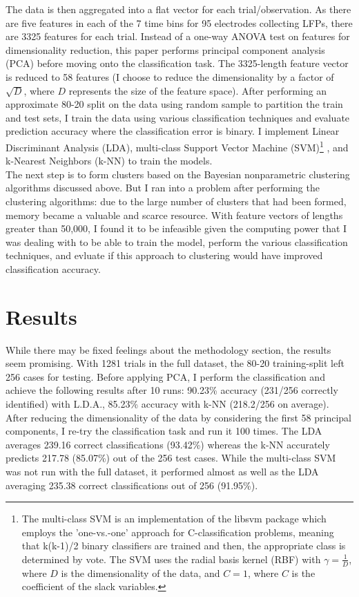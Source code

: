 \documentclass{article}
\begin{document}
\noindent
The data is then aggregated into a flat vector for each trial/observation.  As there are five features in each of the 7 time bins for 95 electrodes collecting LFPs, there are 3325 features for each trial.  Instead of a one-way ANOVA test on features\cite{flint} for dimensionality reduction, this paper performs principal component analysis (PCA) before moving onto the classification task.  The 3325-length feature vector is reduced to 58 features (I choose to reduce the dimensionality by a factor of $\sqrt{D}$, where $D$ represents the size of the feature space).  After performing an approximate 80-20 split on the data using random sample to partition the train and test sets, I train the data using various classification techniques and evaluate prediction accuracy where the classification error is binary.  I implement Linear Discriminant Analysis (LDA), multi-class Support Vector Machine (SVM)\footnote{The multi-class SVM is an implementation of the libsvm package which employs the 'one-vs.-one' approach for C-classification problems, meaning that k(k-1)/2 binary classifiers are trained and then, the appropriate class is determined by vote.  The SVM uses the radial basis kernel (RBF) with $\gamma=\frac{1}{D}$, where $D$ is the dimensionality of the data, and $C=1$, where $C$ is the coefficient of the slack variables.}
, and k-Nearest Neighbors (k-NN) to train the models.\\

\noindent
The next step is to form clusters based on the Bayesian nonparametric clustering algorithms discussed above.  But I ran into a problem after performing the clustering algorithms:  due to the large number of clusters that had been formed, memory became a valuable and scarce resource.  With feature vectors of lengths greater than 50,000, I found it to be infeasible given the computing power that I was dealing with to be able to train the model, perform the various classification techniques, and evluate if this approach to clustering would have improved classification accuracy. \\

\pagebreak
\section{Results}
\noindent
While there may be fixed feelings about the methodology section, the results seem promising.  With 1281 trials in the full dataset, the 80-20 training-split left 256 cases for testing.  Before applying PCA, I perform the classification and achieve the following results after 10 runs:  90.23\% accuracy (231/256 correctly identified) with L.D.A., 85.23\% accuracy with k-NN (218.2/256 on average).  After reducing the dimensionality of the data by considering the first 58 principal components, I re-try the classification task and run it 100 times.  The LDA averages 239.16 correct classifications (93.42\%) whereas the k-NN accurately predicts 217.78 (85.07\%) out of the 256 test cases.  While the multi-class SVM was not run with the full dataset, it performed almost as well as the LDA averaging 235.38 correct classifications out of 256 (91.95\%).  \\
\end{document}
